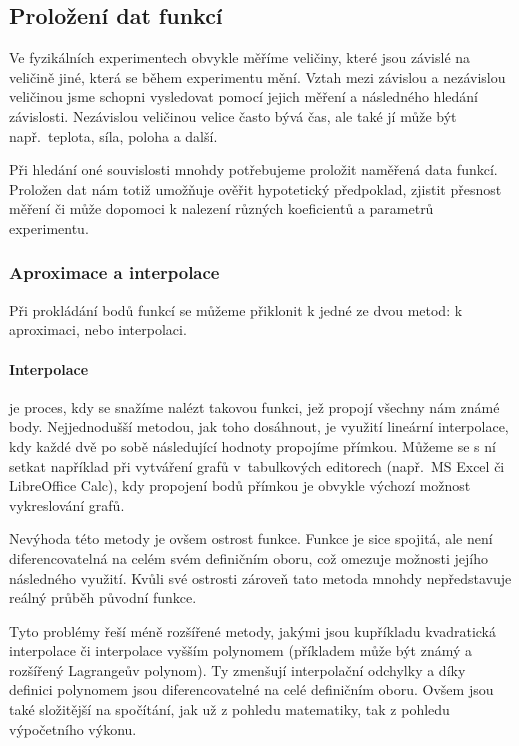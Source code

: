 \newcommand{\nsum}{\sum^n_{i=1}}
\newcommand{\nsumx}{\sum^n_{i=1}x_i}
\newcommand{\nsumy}{\sum^n_{i=1}y_i}
\newcommand{\nsumxx}{\sum^n_{i=1}x_i^2}
\newcommand{\nsumxy}{\sum^n_{i=1}x_iy_i}

\subsection{Proložení dat funkcí}
Ve fyzikálních experimentech obvykle měříme veličiny, které jsou závislé na
veličině jiné, která se během experimentu mění. Vztah mezi závislou a
nezávislou veličinou jsme schopni vysledovat pomocí jejich měření a následného
hledání závislosti.  Nezávislou veličinou velice často bývá čas, ale také jí
může být např.~teplota, síla, poloha a další.~\cite{praktikum}
 
Při hledání oné souvislosti mnohdy potřebujeme proložit naměřená data funkcí.
Proložen dat nám totiž umožňuje ověřit hypotetický předpoklad, zjistit přesnost
měření či může dopomoci k nalezení různých koeficientů a parametrů experimentu.

\subsubsection{Aproximace a interpolace}
Při prokládání bodů funkcí se můžeme přiklonit k jedné ze dvou metod: k
aproximaci, nebo interpolaci.

\paragraph{Interpolace} je proces, kdy se snažíme nalézt takovou funkci, jež
propojí všechny nám známé body. Nejjednodušší metodou, jak toho dosáhnout, je
využití lineární interpolace, kdy každé dvě po sobě následující hodnoty
propojíme přímkou. Můžeme se s ní setkat například při vytváření grafů
v~tabulkových editorech (např.~MS Excel či LibreOffice Calc), kdy propojení
bodů přímkou je obvykle výchozí možnost vykreslování grafů. 

Nevýhoda této metody je ovšem ostrost funkce. Funkce je sice spojitá, ale není
diferencovatelná na celém svém definičním oboru, což omezuje možnosti jejího
následného využití. Kvůli své ostrosti zároveň tato metoda mnohdy nepředstavuje
reálný průběh původní funkce.~\cite{segeth}

Tyto problémy řeší méně rozšířené metody, jakými jsou kupříkladu kvadratická
interpolace či interpolace vyšším polynomem (příkladem může být známý a
rozšířený Lagrangeův polynom). Ty zmenšují interpolační odchylky a díky
definici polynomem jsou diferencovatelné na celé definičním oboru. Ovšem jsou
také složitější na spočítání, jak už z pohledu matematiky, tak z pohledu
výpočetního výkonu.

